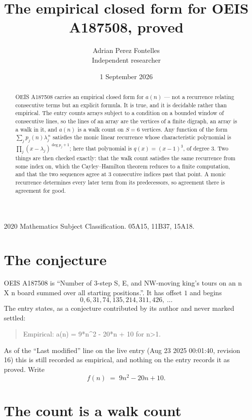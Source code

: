 \documentclass[11pt,a4paper]{article}
\title{The empirical closed form for OEIS A187508, proved}
\author{Adrian Perez Fontelles\\ \small Independent researcher}
\date{1 September 2026}
\theoremstyle{plain}
\theoremstyle{definition}
\begin{document}
\maketitle

\begin{abstract}
OEIS A187508 carries an empirical closed form for $a(n)$ --- not a recurrence relating
consecutive terms but an explicit formula. It is true, and it is decidable rather than
empirical. The entry counts arrays subject to a condition on a bounded window of consecutive lines, so the lines of an array are the
vertices of a finite digraph, an array is a walk in it, and $a(n)$ is a walk count on
$S=6$ vertices. Any function of the form $\sum_j p_j(n)\lambda_j^{\,n}$ satisfies the
monic linear recurrence whose characteristic polynomial is
$\prod_j(x-\lambda_j)^{\deg p_j+1}$; here that polynomial is $q(x)=(x-1)^{3}$, of degree
$3$. Two things are then checked exactly: that the walk count satisfies the same
recurrence from some index on, which the Cayley--Hamilton theorem reduces to a finite
computation, and that the two sequences agree at $3$ consecutive indices past that
point. A monic recurrence determines every later term from its predecessors, so agreement
there is agreement for good.
\end{abstract}

\noindent\small 2020 Mathematics Subject Classification. 05A15, 11B37, 15A18.\normalsize

\section{The conjecture}

OEIS A187508 is ``Number of 3-step S, E, and NW-moving king's tours on an n X n board summed over all starting positions.''. It has offset $1$ and begins
\[
0, 6, 31, 74, 135, 214, 311, 426,\ \dots
\]
The entry states, as a conjecture contributed by its author and never marked settled:
\begin{quote}
Empirical: a(n) = 9*n\^{}2 - 20*n + 10 for n>1.
\end{quote}
As of the ``Last modified'' line on the live entry (Aug 23 2025 00:01:40, revision 16) this is still
recorded as empirical, and nothing on the entry records it as proved. Write
\[
f(n)\;=\;9 n^{2} - 20 n + 10.
\]

\section{The count is a walk count}
\end{document}
